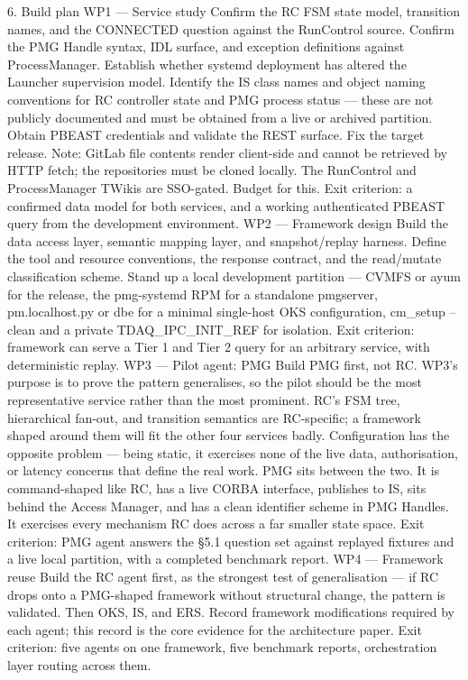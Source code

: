6. Build plan
WP1 — Service study
Confirm the RC FSM state model, transition names, and the CONNECTED question against the RunControl source. Confirm the PMG Handle syntax, IDL surface, and exception definitions against ProcessManager. Establish whether systemd deployment has altered the Launcher supervision model. Identify the IS class names and object naming conventions for RC controller state and PMG process status — these are not publicly documented and must be obtained from a live or archived partition. Obtain PBEAST credentials and validate the REST surface. Fix the target release.
Note: GitLab file contents render client-side and cannot be retrieved by HTTP fetch; the repositories must be cloned locally. The RunControl and ProcessManager TWikis are SSO-gated. Budget for this.
Exit criterion: a confirmed data model for both services, and a working authenticated PBEAST query from the development environment.
WP2 — Framework design
Build the data access layer, semantic mapping layer, and snapshot/replay harness. Define the tool and resource conventions, the response contract, and the read/mutate classification scheme. Stand up a local development partition — CVMFS or ayum for the release, the pmg-systemd RPM for a standalone pmgserver, pm.localhost.py or dbe for a minimal single-host OKS configuration, cm_setup --clean and a private TDAQ_IPC_INIT_REF for isolation.
Exit criterion: framework can serve a Tier 1 and Tier 2 query for an arbitrary service, with deterministic replay.
WP3 — Pilot agent: PMG
Build PMG first, not RC. WP3's purpose is to prove the pattern generalises, so the pilot should be the most representative service rather than the most prominent. RC's FSM tree, hierarchical fan-out, and transition semantics are RC-specific; a framework shaped around them will fit the other four services badly. Configuration has the opposite problem — being static, it exercises none of the live data, authorisation, or latency concerns that define the real work.
PMG sits between the two. It is command-shaped like RC, has a live CORBA interface, publishes to IS, sits behind the Access Manager, and has a clean identifier scheme in PMG Handles. It exercises every mechanism RC does across a far smaller state space.
Exit criterion: PMG agent answers the §5.1 question set against replayed fixtures and a live local partition, with a completed benchmark report.
WP4 — Framework reuse
Build the RC agent first, as the strongest test of generalisation — if RC drops onto a PMG-shaped framework without structural change, the pattern is validated. Then OKS, IS, and ERS. Record framework modifications required by each agent; this record is the core evidence for the architecture paper.
Exit criterion: five agents on one framework, five benchmark reports, orchestration layer routing across them.

